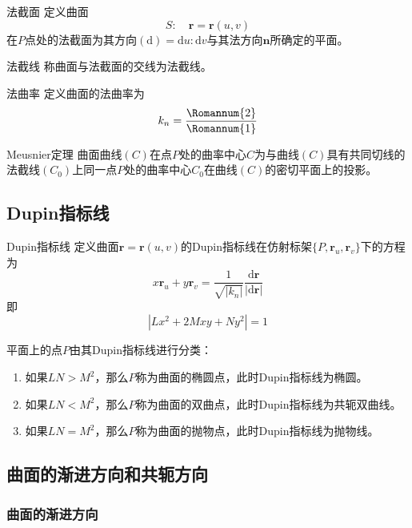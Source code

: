 \documentclass[lang = cn, scheme = chinese, thmcnt = section]{elegantbook}
\newcommand{\bs}{\boldsymbol}          %
\newcommand{\dd}{\mathrm{d}}           %
\begin{document}
\begin{definition}{法截面}
	定义曲面
	$$
	S:\quad \bs{r}=\bs{r}(u,v)
	$$
	在$P$点处的法截面为其方向$(\dd)=\dd u:\dd v$与其法方向$\bs{n}$所确定的平面。
\end{definition}

\begin{definition}{法截线}
	称曲面与法截面的交线为法截线。
\end{definition}

\begin{definition}{法曲率}
	定义曲面的法曲率为%
	$$
	k_n=\frac{{\rm\Romannum{2}}}{{\rm\Romannum{1}}}
	$$
\end{definition}

\begin{theorem}{Meusnier定理}
	曲面曲线$(C)$在点$P$处的曲率中心$C$为与曲线$(C)$具有共同切线的法截线$(C_0)$上同一点$P$处的曲率中心$C_0$在曲线$(C)$的密切平面上的投影。
\end{theorem}

\subsection{Dupin指标线}

\begin{definition}{Dupin指标线}
	定义曲面$\bs{r}=\bs{r}(u,v)$的Dupin指标线在仿射标架$\{ P,\bs{r}_u,\bs{r}_v \}$下的方程为%
	$$
	x\bs{r}_u+y\bs{r}_v=\frac{1}{\sqrt{|k_n|}}\frac{\dd \bs{r}}{|\dd \bs{r}|}
	$$
	即%
	$$
	|Lx^2+2Mxy+Ny^2|=1
	$$
\end{definition}

平面上的点$P$由其Dupin指标线进行分类：
\begin{enumerate}
	\item 如果$LN>M^2$，那么$P$称为曲面的椭圆点，此时Dupin指标线为椭圆。
	\item 如果$LN<M^2$，那么$P$称为曲面的双曲点，此时Dupin指标线为共轭双曲线。
	\item 如果$LN=M^2$，那么$P$称为曲面的抛物点，此时Dupin指标线为抛物线。
\end{enumerate}

\subsection{曲面的渐进方向和共轭方向}

\subsubsection{曲面的渐进方向}
\end{document}
